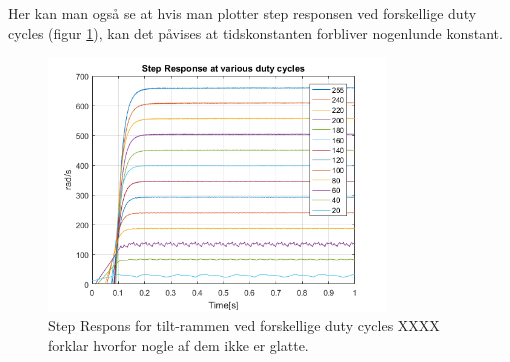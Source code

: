Her kan man også se at hvis man plotter step responsen ved forskellige duty cycles (figur \ref{fig:RPM_DC}), kan det påvises at tidskonstanten forbliver nogenlunde konstant. 

\begin{figure}[!ht]
	\begin{center}
		\includegraphics[width=0.8\textwidth]{Billeder/RPM_vs_DC.png}
	\end{center}
	\caption{Step Respons for tilt-rammen ved forskellige duty cycles XXXX forklar hvorfor nogle af dem ikke er glatte.}
	\label{fig:RPM_DC}
\end{figure}